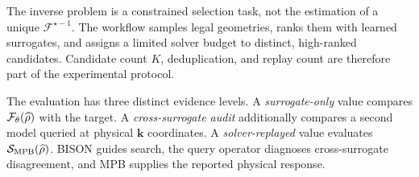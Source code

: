 The inverse problem is a constrained selection task, not the estimation of a
unique \(\mathcal{F}^{\star-1}\). The workflow samples legal geometries, ranks
them with learned surrogates, and assigns a limited solver budget to distinct,
high-ranked candidates. Candidate count \(K\), deduplication, and replay count
are therefore part of the experimental protocol.

The evaluation has three distinct evidence levels. A
\emph{surrogate-only} value compares \(\mathcal{F}_{\theta}(\widehat{\rho})\) with the
target. A \emph{cross-surrogate audit} additionally compares a second model
queried at physical \(\mathbf{k}\) coordinates. A \emph{solver-replayed}
value evaluates \(\mathcal{S}_{\mathrm{MPB}}(\widehat{\rho})\). BISON guides search, the query
operator diagnoses cross-surrogate disagreement, and MPB supplies the reported
physical response.
